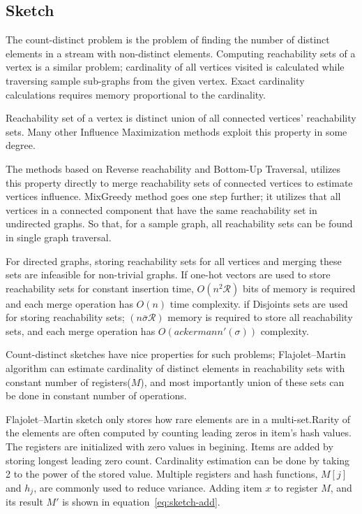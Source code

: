 \documentclass[10pt,journal,compsoc]{IEEEtran}
\begin{document}
\subsection{Sketch}\label{sec:sketch}
The count-distinct problem is the problem of finding the number of distinct elements in a stream with non-distinct elements. Computing reachability sets of a vertex is a similar problem; cardinality of all vertices visited is calculated while traversing sample sub-graphs from the given vertex. Exact cardinality calculations requires memory proportional to the cardinality. 

Reachability set of a vertex is distinct union of all connected vertices' reachability sets. Many other Influence Maximization methods exploit this property in some degree. 

The methods based on Reverse reachability and Bottom-Up Traversal, utilizes this property directly to merge reachability sets of connected vertices to estimate vertices influence.
MixGreedy method goes one step further; it utilizes that all vertices in a connected component that have the same reachability set in undirected graphs. So that, for a sample graph, all reachability sets can be found in single graph traversal. 

For directed graphs, storing reachability sets for all vertices and merging these sets are infeasible for non-trivial graphs. 
If one-hot vectors are used to store reachability sets for constant insertion time, $O(n^2\mathcal{R})$ bits of memory is required and each merge operation has $O(n)$ time complexity. 
if Disjoints sets are used for storing reachability sets; $(n\bar{\sigma}\mathcal{R})$ memory is required to store all reachability sets, and each merge operation has $O(ackermann'(\sigma))$ complexity.

Count-distinct sketches have nice properties for such problems; Flajolet–Martin algorithm\cite{flajolet1985probabilistic} can estimate cardinality of distinct elements in reachability sets with constant number of registers($M$), and most importantly union of these sets can be done in constant number of operations.

Flajolet–Martin sketch only stores how rare elements are in a multi-set.Rarity of the elements are often computed by counting leading zeros in item's hash values.  The registers are initialized with zero values in begining. Items are added by storing longest leading zero count. Cardinality estimation can be done by taking 2 to the power of the stored value. Multiple registers and hash functions, $M[j]$ and $h_j$, are commonly used to reduce variance.
Adding item $x$ to register $M$, and its result $M'$ is shown in equation~\ref{eq:sketch-add}.
\end{document}
